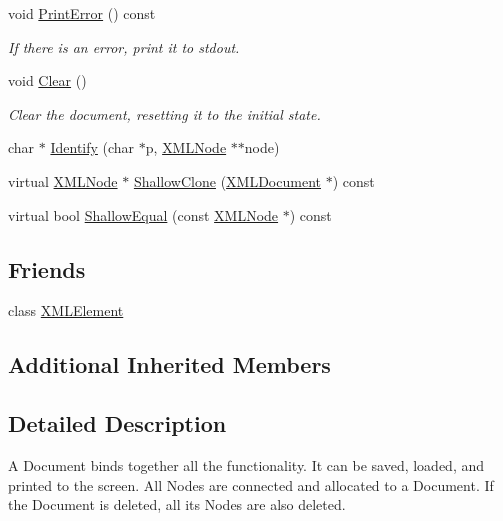 \begin{DoxyCompactItemize}
void \hyperlink{classtinyxml2_1_1_x_m_l_document_a7545cc9a9a67eee9307c001aa316a388}{Print\-Error} () const 
\begin{DoxyCompactList}\small\item\em If there is an error, print it to stdout. \end{DoxyCompactList}\item 
void \hyperlink{classtinyxml2_1_1_x_m_l_document_a65656b0b2cbc822708eb351504178aaf}{Clear} ()
\begin{DoxyCompactList}\small\item\em Clear the document, resetting it to the initial state. \end{DoxyCompactList}\item 
char $\ast$ \hyperlink{classtinyxml2_1_1_x_m_l_document_a25827d1bec509ad566a107e5853ed040}{Identify} (char $\ast$p, \hyperlink{classtinyxml2_1_1_x_m_l_node}{X\-M\-L\-Node} $\ast$$\ast$node)
\item 
virtual \hyperlink{classtinyxml2_1_1_x_m_l_node}{X\-M\-L\-Node} $\ast$ \hyperlink{classtinyxml2_1_1_x_m_l_document_a57c8511ed9f83aa3e20909a3db3f83d0}{Shallow\-Clone} (\hyperlink{classtinyxml2_1_1_x_m_l_document}{X\-M\-L\-Document} $\ast$) const 
\item 
virtual bool \hyperlink{classtinyxml2_1_1_x_m_l_document_a12eac66c6e45d074d5cc47319868cd66}{Shallow\-Equal} (const \hyperlink{classtinyxml2_1_1_x_m_l_node}{X\-M\-L\-Node} $\ast$) const 
\end{DoxyCompactItemize}
\subsection*{Friends}
\begin{DoxyCompactItemize}
\item 
class \hyperlink{classtinyxml2_1_1_x_m_l_document_ac2fba9b6e452829dd892f7392c24e0eb}{X\-M\-L\-Element}
\end{DoxyCompactItemize}
\subsection*{Additional Inherited Members}


\subsection{Detailed Description}
A Document binds together all the functionality. It can be saved, loaded, and printed to the screen. All Nodes are connected and allocated to a Document. If the Document is deleted, all its Nodes are also deleted. 

